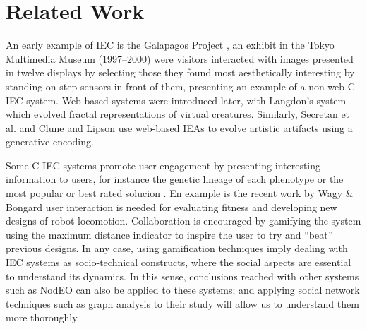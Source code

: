 \section{Related Work}
\label{sec:related}

An early example of IEC is the Galapagos Project \cite{sims1997interactivity},
an exhibit in the Tokyo Multimedia Museum (1997--2000) 
were visitors interacted with images presented in 
twelve displays by selecting those they found most aesthetically interesting by standing on
step sensors in front of them, presenting an example of a non web
C-IEC system. Web based systems were introduced later, with  
Langdon's system \cite{langdon:2004} which evolved fractal representations of virtual creatures. 
Similarly, Secretan et al. \cite{picbreeder} and Clune and Lipson \cite{forms} 
use web-based IEAs to evolve artistic artifacts using a generative encoding.

Some C-IEC systems promote user engagement by presenting interesting information to 
users, for instance the genetic lineage of each phenotype or the most popular or 
best rated solucion \cite{picbreeder,forms}. En example is the recent work by 
Wagy \& Bongard \cite{wagy2014collective} user interaction 
is needed for evaluating fitness and developing
new designs of robot locomotion. Collaboration is encouraged by gamifying the system 
using the maximum distance indicator to inspire the user to try and ``beat'' previous designs. 
In any case, using gamification techniques imply dealing with IEC
systems as socio-technical constructs, where the social aspects are
essential to understand its dynamics. In this sense, conclusions
reached with other systems such as NodEO \cite{DBLP:conf/gecco/MereloCGCRV16}
can also be applied to these systems; and applying social 
network techniques such as graph analysis
to their study will allow us to understand them more thoroughly. 


